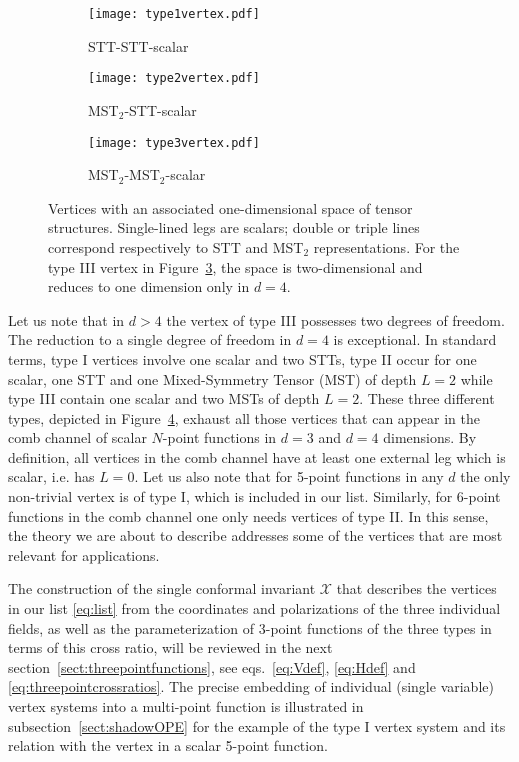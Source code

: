 \documentclass{article}
\begin{document}
\begin{figure}[thb]
\begin{subfigure}[b]{.33\textwidth}
\centering
\texttt{[image: type1vertex.pdf]}
\caption{STT-STT-scalar}
\label{fig:type1vertex}
\end{subfigure}%
\begin{subfigure}[b]{.33\textwidth}
\centering
\texttt{[image: type2vertex.pdf]}
\caption{MST$_2$-STT-scalar}
\label{fig:type2vertex}
\end{subfigure}%
\begin{subfigure}[b]{.33\textwidth}
\centering
\texttt{[image: type3vertex.pdf]}
\caption{MST$_2$-MST$_2$-scalar}
\label{fig:type3vertex}
\end{subfigure}
\caption{Vertices with an associated one-dimensional space of tensor structures. Single-lined legs are scalars; double or triple lines correspond respectively to STT and MST$_2$ representations. For the type III vertex in Figure~\ref{fig:type3vertex}, the space is two-dimensional and reduces to one dimension only in $d=4$.}
\label{fig:typevertices}
\end{figure}
Let us note that in $d > 4$ the vertex of type III possesses two degrees of 
freedom. The reduction to a single degree of freedom in $d=4$ is exceptional. 
In standard terms, type I vertices involve one scalar and two STTs, type II 
occur for one scalar, one STT and one Mixed-Symmetry Tensor (MST) of depth $L=2$ 
while type III contain one scalar and two MSTs of depth $L=2$. These three different 
types, depicted in Figure~\ref{fig:typevertices}, exhaust all those vertices that can appear in the comb channel of scalar $N$-point 
functions in $d=3$ and $d=4$ dimensions. By definition, all vertices in the comb 
channel have at least one external leg which is scalar, i.e. has $L =0$. Let us also 
note that for 5-point functions in any $d$ the only non-trivial vertex is of type I, 
which is included in our list. Similarly, for 6-point functions in the comb channel 
one only needs vertices of type II. In this sense, the theory we are about to describe 
addresses some of the vertices that are most relevant for applications. 

The construction of the single conformal invariant $\mathcal{X}$ that describes the 
vertices in our list \eqref{eq:list} from the coordinates and polarizations of the 
three individual fields, as well as the parameterization of 3-point functions of the 
three types in terms of this cross ratio, will be reviewed in the next section~\ref{sect:threepointfunctions}, see eqs.\ 
\eqref{eq:Vdef}, \eqref{eq:Hdef} and \eqref{eq:threepointcrossratios}. The precise embedding 
of individual (single variable) vertex systems into a multi-point function is illustrated in 
subsection~\ref{sect:shadowOPE} for the example of the type I vertex system and its relation 
with the vertex in a scalar 5-point function. 
\end{document}
